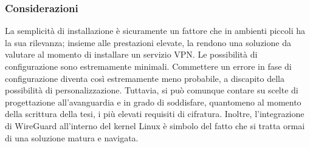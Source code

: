 \subsubsection{Considerazioni}
La semplicità di installazione è sicuramente un fattore che in ambienti piccoli ha la sua rilevanza; insieme alle prestazioni elevate, la rendono una soluzione da valutare al momento di installare un servizio VPN.
Le possibilità di configurazione sono estremamente minimali. Commettere un errore in fase di configurazione diventa così estremamente meno probabile, a discapito della possibilità di personalizzazione.
Tuttavia, si può comunque contare su scelte di progettazione all'avanguardia e in grado di soddisfare, quantomeno al momento della scrittura della tesi, i più elevati requisiti di cifratura.
Inoltre, l'integrazione di WireGuard all'interno del kernel Linux è simbolo del fatto che si tratta ormai di una soluzione matura e navigata.